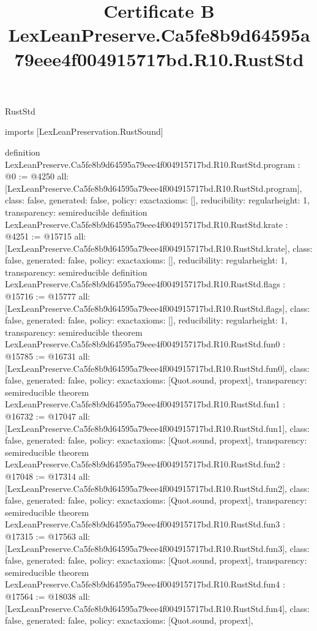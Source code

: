 \begin{lexlean}{RustStd}
\title{Certificate B LexLeanPreserve.Ca5fe8b9d64595a79eee4f004915717bd.R10.RustStd}
\begin{coremodule}
imports [LexLeanPreservation.RustSound]

definition LexLeanPreserve.Ca5fe8b9d64595a79eee4f004915717bd.R10.RustStd.program : @0 := @4250 {
  all: [LexLeanPreserve.Ca5fe8b9d64595a79eee4f004915717bd.R10.RustStd.program],
  class: false,
  generated: false,
  policy: exact{axioms: []},
  reducibility: regular{height: 1},
  transparency: semireducible
}
definition LexLeanPreserve.Ca5fe8b9d64595a79eee4f004915717bd.R10.RustStd.krate : @4251 := @15715 {
  all: [LexLeanPreserve.Ca5fe8b9d64595a79eee4f004915717bd.R10.RustStd.krate],
  class: false,
  generated: false,
  policy: exact{axioms: []},
  reducibility: regular{height: 1},
  transparency: semireducible
}
definition LexLeanPreserve.Ca5fe8b9d64595a79eee4f004915717bd.R10.RustStd.flags : @15716 := @15777 {
  all: [LexLeanPreserve.Ca5fe8b9d64595a79eee4f004915717bd.R10.RustStd.flags],
  class: false,
  generated: false,
  policy: exact{axioms: []},
  reducibility: regular{height: 1},
  transparency: semireducible
}
theorem LexLeanPreserve.Ca5fe8b9d64595a79eee4f004915717bd.R10.RustStd.fun0 : @15785 := @16731 {
  all: [LexLeanPreserve.Ca5fe8b9d64595a79eee4f004915717bd.R10.RustStd.fun0],
  class: false,
  generated: false,
  policy: exact{axioms: [Quot.sound, propext]},
  transparency: semireducible
}
theorem LexLeanPreserve.Ca5fe8b9d64595a79eee4f004915717bd.R10.RustStd.fun1 : @16732 := @17047 {
  all: [LexLeanPreserve.Ca5fe8b9d64595a79eee4f004915717bd.R10.RustStd.fun1],
  class: false,
  generated: false,
  policy: exact{axioms: [Quot.sound, propext]},
  transparency: semireducible
}
theorem LexLeanPreserve.Ca5fe8b9d64595a79eee4f004915717bd.R10.RustStd.fun2 : @17048 := @17314 {
  all: [LexLeanPreserve.Ca5fe8b9d64595a79eee4f004915717bd.R10.RustStd.fun2],
  class: false,
  generated: false,
  policy: exact{axioms: [Quot.sound, propext]},
  transparency: semireducible
}
theorem LexLeanPreserve.Ca5fe8b9d64595a79eee4f004915717bd.R10.RustStd.fun3 : @17315 := @17563 {
  all: [LexLeanPreserve.Ca5fe8b9d64595a79eee4f004915717bd.R10.RustStd.fun3],
  class: false,
  generated: false,
  policy: exact{axioms: [Quot.sound, propext]},
  transparency: semireducible
}
theorem LexLeanPreserve.Ca5fe8b9d64595a79eee4f004915717bd.R10.RustStd.fun4 : @17564 := @18038 {
  all: [LexLeanPreserve.Ca5fe8b9d64595a79eee4f004915717bd.R10.RustStd.fun4],
  class: false,
  generated: false,
  policy: exact{axioms: [Quot.sound, propext]},
}
\end{coremodule}
\end{lexlean}
